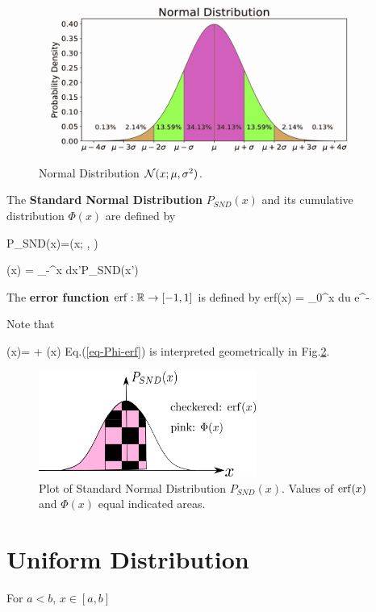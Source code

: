 \begin{figure}[h!]
\centering
\includegraphics[width=5in]
{conventions/normal-dist.png}
\caption{Normal Distribution
${\cal N}(x;\mu, \sigma^2)$.}
\label{fig-norm-dist}
\end{figure}

The {\bf Standard Normal Distribution} $P_{SND}(x)$
and its cumulative distribution $\Phi(x)$ are defined by

\beq
P_{SND}(x)=\caln(x; , )
\eeq

\beq
\Phi(x) = \int_{-\infty}^x dx'\;P_{SND}(x')
\eeq

The {\bf error function} ${\rm erf}:{ \mathbb{R}}\rightarrow [-1,1]$
is defined by
\beq
{\rm erf}(x) = 
\int_0^x du \; e^{-\;}
\eeq

Note that

\beq
\Phi(x)=  + (x)
\label{eq-Phi-erf}
\eeq
Eq.(\ref{eq-Phi-erf})
is interpreted geometrically in Fig.\ref{fig-erf}.

\begin{figure}[h!]
\centering
\includegraphics[width=2.8in]
{conventions/erf.png}
\caption{Plot of Standard
Normal Distribution $P_{SND}(x)$.
 Values of ${\rm erf}(x)$ and $\Phi(x)$
 equal indicated areas.}
 \label{fig-erf}
\end{figure}
\section{Uniform Distribution}
For $a<b$, $x\in [a,b]$

